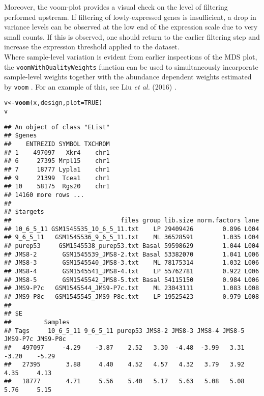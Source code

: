 \documentclass[10pt,a4paper]{extarticle}\usepackage[]{graphicx}\usepackage[]{color}
\makeatletter
\newcommand{\hlnum}[1]{\textcolor[rgb]{0.686,0.059,0.569}{#1}}%
\newcommand{\hlstd}[1]{\textcolor[rgb]{0.345,0.345,0.345}{#1}}%
\newcommand{\hlkwb}[1]{\textcolor[rgb]{0.69,0.353,0.396}{#1}}%
\newcommand{\hlkwc}[1]{\textcolor[rgb]{0.333,0.667,0.333}{#1}}%
\newcommand{\hlkwd}[1]{\textcolor[rgb]{0.737,0.353,0.396}{\textbf{#1}}}%
\newenvironment{kframe}{%
 \def\at@end@of@kframe{}%
 \ifinner\ifhmode%
  \def\at@end@of@kframe{\end{minipage}}%
  \begin{minipage}{\columnwidth}%
 \fi\fi%
 \def\FrameCommand##1{\hskip\@totalleftmargin \hskip-\fboxsep
 \colorbox{shadecolor}{##1}\hskip-\fboxsep
     \hskip-\linewidth \hskip-\@totalleftmargin \hskip\columnwidth}%
 \MakeFramed {\advance\hsize-\width
   \@totalleftmargin\z@ \linewidth\hsize
   \@setminipage}}%
 {\par\unskip\endMakeFramed%
 \at@end@of@kframe}
\newenvironment{knitrout}{}{} %
\makeatother
\begin{document}
Moreover, the voom-plot provides a visual check on the level of filtering performed upstream. If filtering of lowly-expressed genes is insufficient, a drop in variance levels can be observed at the low end of the expression scale due to very small counts. If this is observed, one should return to the earlier filtering step and increase the expression threshold applied to the dataset.\\

Where sample-level variation is evident from earlier inspections of the MDS plot, the \texttt{voomWithQualityWeights} function can be used to simultaneously incorporate sample-level weights together with the abundance dependent weights estimated by \texttt{voom} \cite{Liu:NAR:2015}. For an example of this, see Liu {\it et al.} (2016) \cite{Liu:GenomicsData:2016}.
\begin{knitrout}
\color{fgcolor}\begin{kframe}
\begin{alltt}
\hlstd{v} \hlkwb{<-} \hlkwd{voom}\hlstd{(x, design,} \hlkwc{plot}\hlstd{=}\hlnum{TRUE}\hlstd{)}
\hlstd{v}
\end{alltt}
\begin{verbatim}
## An object of class "EList"
## $genes
##    ENTREZID SYMBOL TXCHROM
## 1    497097   Xkr4    chr1
## 6     27395 Mrpl15    chr1
## 7     18777 Lypla1    chr1
## 9     21399  Tcea1    chr1
## 10    58175  Rgs20    chr1
## 14160 more rows ...
## 
## $targets
##                              files group lib.size norm.factors lane
## 10_6_5_11 GSM1545535_10_6_5_11.txt    LP 29409426        0.896 L004
## 9_6_5_11   GSM1545536_9_6_5_11.txt    ML 36528591        1.035 L004
## purep53     GSM1545538_purep53.txt Basal 59598629        1.044 L004
## JMS8-2       GSM1545539_JMS8-2.txt Basal 53382070        1.041 L006
## JMS8-3       GSM1545540_JMS8-3.txt    ML 78175314        1.032 L006
## JMS8-4       GSM1545541_JMS8-4.txt    LP 55762781        0.922 L006
## JMS8-5       GSM1545542_JMS8-5.txt Basal 54115150        0.984 L006
## JMS9-P7c   GSM1545544_JMS9-P7c.txt    ML 23043111        1.083 L008
## JMS9-P8c   GSM1545545_JMS9-P8c.txt    LP 19525423        0.979 L008
## 
## $E
##         Samples
## Tags     10_6_5_11 9_6_5_11 purep53 JMS8-2 JMS8-3 JMS8-4 JMS8-5 JMS9-P7c JMS9-P8c
##   497097     -4.29    -3.87    2.52   3.30  -4.48  -3.99   3.31    -3.20    -5.29
##   27395       3.88     4.40    4.52   4.57   4.32   3.79   3.92     4.35     4.13
##   18777       4.71     5.56    5.40   5.17   5.63   5.08   5.08     5.76     5.15

\end{verbatim}
\end{kframe}
\end{knitrout}
\end{document}
